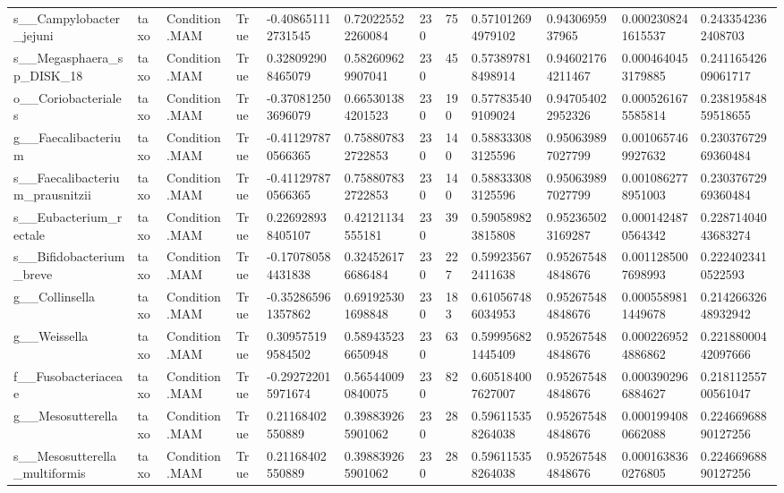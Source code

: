 \begin{longtable}{llllllllllll}
s\_\_Campylobacter\_jejuni & taxo & Condition.MAM & True & -0.408651112731545 & 0.720225522260084 & 230 & 75 & 0.571012694979102 & 0.9430695937965 & 0.0002308241615537 & 0.2433542362408703 \\
s\_\_Megasphaera\_sp\_DISK\_18 & taxo & Condition.MAM & True & 0.328092908465079 & 0.582609629907041 & 230 & 45 & 0.573897818498914 & 0.946021764211467 & 0.0004640453179885 & 0.24116542609061717 \\
o\_\_Coriobacteriales & taxo & Condition.MAM & True & -0.370812503696079 & 0.665301384201523 & 230 & 190 & 0.577835409109024 & 0.947054022952326 & 0.0005261675585814 & 0.23819584859518655 \\
g\_\_Faecalibacterium & taxo & Condition.MAM & True & -0.411297870566365 & 0.758807832722853 & 230 & 140 & 0.588333083125596 & 0.950639897027799 & 0.0010657469927632 & 0.23037672969360484 \\
s\_\_Faecalibacterium\_prausnitzii & taxo & Condition.MAM & True & -0.411297870566365 & 0.758807832722853 & 230 & 140 & 0.588333083125596 & 0.950639897027799 & 0.0010862778951003 & 0.23037672969360484 \\
s\_\_Eubacterium\_rectale & taxo & Condition.MAM & True & 0.226928938405107 & 0.42121134555181 & 230 & 39 & 0.590589823815808 & 0.952365023169287 & 0.0001424870564342 & 0.22871404043683274 \\
s\_\_Bifidobacterium\_breve & taxo & Condition.MAM & True & -0.170780584431838 & 0.324526176686484 & 230 & 227 & 0.599235672411638 & 0.952675484848676 & 0.0011285007698993 & 0.2224023410522593 \\
g\_\_Collinsella & taxo & Condition.MAM & True & -0.352865961357862 & 0.691925301698848 & 230 & 183 & 0.610567486034953 & 0.952675484848676 & 0.0005589811449678 & 0.21426632648932942 \\
g\_\_Weissella & taxo & Condition.MAM & True & 0.309575199584502 & 0.589435236650948 & 230 & 63 & 0.599956821445409 & 0.952675484848676 & 0.0002269524886862 & 0.22188000442097666 \\
f\_\_Fusobacteriaceae & taxo & Condition.MAM & True & -0.292722015971674 & 0.565440090840075 & 230 & 82 & 0.605184007627007 & 0.952675484848676 & 0.0003902966884627 & 0.21811255700561047 \\
g\_\_Mesosutterella & taxo & Condition.MAM & True & 0.21168402550889 & 0.398839265901062 & 230 & 28 & 0.596115358264038 & 0.952675484848676 & 0.0001994080662088 & 0.22466968890127256 \\
s\_\_Mesosutterella\_multiformis & taxo & Condition.MAM & True & 0.21168402550889 & 0.398839265901062 & 230 & 28 & 0.596115358264038 & 0.952675484848676 & 0.0001638360276805 & 0.22466968890127256 \\

\end{longtable}
